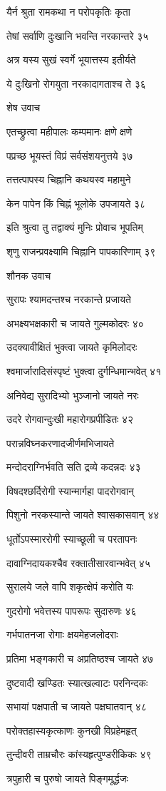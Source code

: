 यैर्न श्रुता रामकथा न परोपकृतिः कृता

तेषां सर्वाणि दुःखानि भवन्ति नरकान्तरे ३५

अत्र यस्य सुखं स्वर्गे भूयात्तस्य इतीर्यते

ये दुःखिनो रोगयुता नरकादागताश्च ते ३६

शेष उवाच

एतच्छ्रुत्वा महीपालः कम्पमानः क्षणे क्षणे

पप्रच्छ भूयस्तं विप्रं सर्वसंशयनुत्तये ३७

तत्तत्पापस्य चिह्नानि कथयस्व महामुने

केन पापेन किं चिह्नं भूलोके उपजायते ३८

इति श्रुत्वा तु तद्वाक्यं मुनिः प्रोवाच भूपतिम्

शृणु राजन्प्रवक्ष्यामि चिह्नानि पापकारिणाम् ३९

शौनक उवाच

सुरापः श्यामदन्तश्च नरकान्ते प्रजायते

अभक्ष्यभक्षकारी च जायते गुल्मकोदरः ४०

उदक्यावीक्षितं भुक्त्वा जायते कृमिलोदरः

श्वमार्जारादिसंस्पृष्टं भुक्त्वा दुर्गन्धिमान्भवेत् ४१

अनिवेद्य सुरादिभ्यो भुञ्जानो जायते नरः

उदरे रोगवान्दुःखी महारोगप्रपीडितः ४२

परान्नविघ्नकरणादजीर्णमभिजायते

मन्दोदराग्निर्भवति सति द्रव्ये कदन्नदः ४३

विषदश्छर्दिरोगी स्यान्मार्गहा पादरोगवान्

पिशुनो नरकस्यान्ते जायते श्वासकासवान् ४४

धूर्तोऽपस्माररोगी स्याच्छूली च परतापनः

दावाग्निदायकश्चैव रक्तातीसारवान्भवेत् ४५

सुरालये जले वापि शकृत्क्षेपं करोति यः

गुदरोगो भवेत्तस्य पापरूपः सुदारुणः ४६

गर्भपातनजा रोगाः क्षयमेहजलोदराः

प्रतिमा भङ्गकारी च अप्रतिष्ठश्च जायते ४७

दुष्टवादी खण्डितः स्यात्खल्वाटः परनिन्दकः

सभायां पक्षपाती च जायते पक्षघातवान् ४८

परोक्तहास्यकृत्काणः कुनखी विप्रहेमहृत्

तुन्दीवरी ताम्रचौरः कांस्यहृत्पुण्डरीकिकः ४९

त्रपुहारी च पुरुषो जायते पिङ्गमूर्द्धजः

